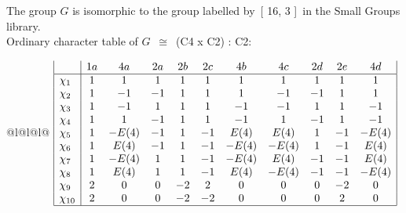 \documentclass[varwidth=\maxdimen,border=10]{standalone}
\begin{document}
The group $G$ is isomorphic to the group labelled by\ [ 16, 3 ]\ in the Small Groups library.\\
Ordinary character table of $G$\ $\cong$\ (C4 x C2) : C2:\\
\begin{center}
\begin{tabular}{@{}l@{}l@{}l@{}}
\hline
\(\begin{array}{|l|cccccccccc|}
  & 1a & 4a & 2a & 2b & 2c & 4b & 4c & 2d & 2e & 4d\\ \hline
\chi_{1} & 1 & 1 & 1 & 1 & 1 & 1 & 1 & 1 & 1 & 1\\
\chi_{2} & 1 & -1 & -1 & 1 & 1 & 1 & -1 & -1 & 1 & 1\\
\chi_{3} & 1 & -1 & 1 & 1 & 1 & -1 & -1 & 1 & 1 & -1\\
\chi_{4} & 1 & 1 & -1 & 1 & 1 & -1 & 1 & -1 & 1 & -1\\
\chi_{5} & 1 & -E(4) & -1 & 1 & -1 & E(4) & E(4) & 1 & -1 & -E(4)\\
\chi_{6} & 1 & E(4) & -1 & 1 & -1 & -E(4) & -E(4) & 1 & -1 & E(4)\\
\chi_{7} & 1 & -E(4) & 1 & 1 & -1 & -E(4) & E(4) & -1 & -1 & E(4)\\
\chi_{8} & 1 & E(4) & 1 & 1 & -1 & E(4) & -E(4) & -1 & -1 & -E(4)\\
\chi_{9} & 2 & 0 & 0 & -2 & 2 & 0 & 0 & 0 & -2 & 0\\
\chi_{10} & 2 & 0 & 0 & -2 & -2 & 0 & 0 & 0 & 2 & 0\\
\hline
\end{array}\)\\
\end{tabular}
\end{center}
\end{document}
